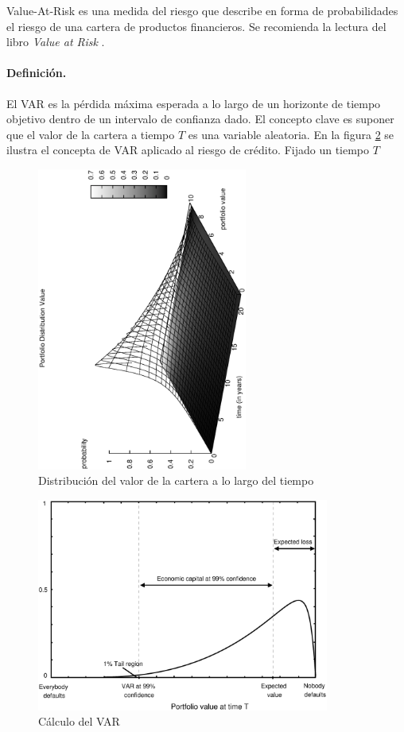 Value-At-Risk es una medida del riesgo que describe en forma de probabilidades
el riesgo de una cartera de productos financieros. Se recomienda la lectura del
libro \emph{Value at Risk} \cite{var:jorion}.

\paragraph{Definici\'on.} El VAR es la p\'erdida m\'axima esperada a lo largo
de un horizonte de tiempo objetivo dentro de un intervalo de confianza dado.
\newline
\newline
El concepto clave es suponer que el valor de la cartera a tiempo $T$ es una 
variable aleatoria. En la figura \ref{creditvar} se ilustra el concepta de VAR 
aplicado al riesgo de cr\'edito. Fijado un tiempo $T$

\begin{figure}[!hb]
\begin{center}
\includegraphics[height=10cm, angle=-90]{./images/pdistrib.ps}
\caption{Distribuci\'on del valor de la cartera a lo largo del tiempo}
\label{pdistrib}
\end{center}
\end{figure}

\begin{figure}[!hb]
\begin{center}
\includegraphics[height=7cm, angle=0]{./images/creditvar.eps}
\caption{C\'alculo del VAR}
\label{creditvar}
\end{center}
\end{figure}

